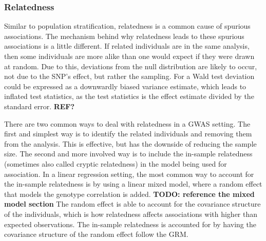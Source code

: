 \subsubsection{Relatedness}
Similar to population stratification, relatedness is a common cause of spurious associations. The mechanism behind why relatedness leads to these spurious associations is a little different. If related individuals are in the same analysis, then some individuals are more alike than one would expect if they were drawn at random. Due to this, deviations from the null distribution are likely to occur, not due to the SNP's effect, but rather the sampling. For a Wald test deviation could be expressed as a downwardly biased variance estimate, which leads to inflated test statistics, as the test statistics is the effect estimate divided by the standard error. \textbf{REF?}

There are two common ways to deal with relatedness in a GWAS setting. The first and simplest way is to identify the related individuals and removing them from the analysis. This is effective, but has the downside of reducing the sample size. The second and more involved way is to include the in-sample relatedness (sometimes also called cryptic relatedness) in the model being used for association. In a linear regression setting, the most common way to account for the in-sample relatedness is by using a linear mixed model, where a random effect that models the genotype correlation is added. \textbf{TODO: reference the mixed model section} The random effect is able to account for the covariance structure of the individuals, which is how relatedness affects associations with higher than expected observations\cite{yu2006unified, kang2008efficient}. The in-sample relatedness is accounted for by having the covariance structure of the random effect follow the GRM.

